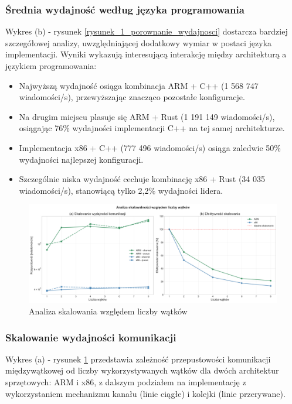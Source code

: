 \subsubsection{Średnia wydajność według języka programowania}
Wykres (b) - rysunek \ref{rysunek_1_porownanie_wydajnosci} dostarcza bardziej szczegółowej analizy, uwzględniającej dodatkowy wymiar w postaci języka implementacji. Wyniki wykazują interesującą interakcję między architekturą a językiem programowania:
\begin{itemize}
    \item Najwyższą wydajność osiąga kombinacja ARM + C++ (1 568 747 wiadomości/s), przewyższając znacząco pozostałe konfiguracje.
    \item Na drugim miejscu plasuje się ARM + Rust (1 191 149 wiadomości/s), osiągając 76\% wydajności implementacji C++ na tej samej architekturze.
    \item Implementacja x86 + C++ (777 496 wiadomości/s) osiąga zaledwie 50\% wydajności najlepszej konfiguracji.
    \item Szczególnie niska wydajność cechuje kombinację x86 + Rust (34 035 wiadomości/s), stanowiącą tylko 2,2\% wydajności lidera.
\end{itemize}

\begin{figure}[H]
    \centering
    \includegraphics[width=\textwidth]{analiza/images/conc/pc/compare/rysunek_2_skalowanie_watkow.png}
    \caption{Analiza skalowania względem liczby wątków}
    \label{rysunek_2_skalowanie_watkow}
\end{figure}
\subsubsection{Skalowanie wydajności komunikacji}
Wykres (a) - rysunek \ref{rysunek_2_skalowanie_watkow} przedstawia zależność przepustowości komunikacji międzywątkowej od liczby wykorzystywanych wątków dla dwóch architektur sprzętowych: ARM i x86, z dalszym podziałem na implementację z wykorzystaniem mechanizmu kanału (linie ciągłe) i kolejki (linie przerywane).

